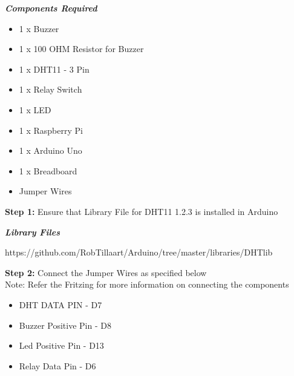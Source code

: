 \documentclass[12pt,a4paper]{article}
\begin{document}
\begin{flushleft}
\textbf{\textit{Components Required}}
\begin{itemize}[noitemsep,nolistsep]
\item 1 x Buzzer
\item 1 x 100 OHM Resistor for Buzzer
\item 1 x DHT11 - 3 Pin
\item 1 x Relay Switch
\item 1 x LED
\item 1 x Raspberry Pi
\item 1 x Arduino Uno
\item 1 x Breadboard
\item Jumper Wires
\end{itemize}
\vspace{5mm}

\textbf{Step 1:} Ensure that Library File for DHT11 1.2.3 is installed in Arduino\\
\vspace{5mm}

\textbf{\textit{Library Files}}\\ \begin{itemize}
https://github.com/RobTillaart/Arduino/tree/master/libraries/DHTlib
\end{itemize}
\vspace{5mm}

\textbf{Step 2:} Connect the Jumper Wires as specified below \\
Note: Refer the Fritzing for more information on connecting the components \\
\vspace{5mm}

\begin{itemize}[noitemsep,nolistsep]
\item DHT DATA PIN - D7
\item Buzzer Positive Pin - D8
\item Led Positive Pin - D13
\item Relay Data Pin - D6


\end{itemize}
\end{flushleft}
\end{document}
